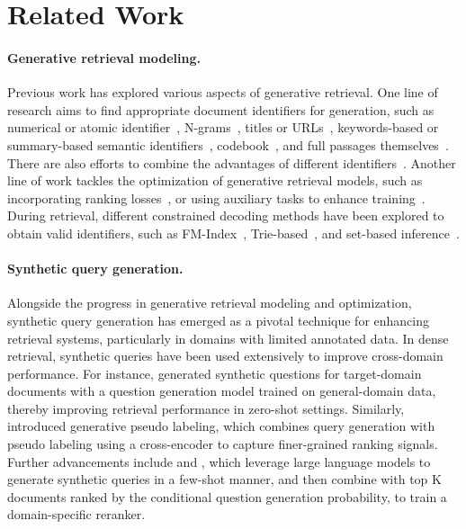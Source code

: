 \section{Related Work}
\paragraph{Generative retrieval modeling.}
Previous work has explored various aspects of generative retrieval. One line of research aims to find appropriate document identifiers for generation, such as numerical or atomic identifier~\citep{DBLP:conf/nips/Tay00NBM000GSCM22,DBLP:journals/corr/abs-2206-10128,DBLP:journals/corr/abs-2208-09257}, N-grams~\citep{DBLP:conf/nips/BevilacquaOLY0P22,DBLP:conf/sigir/Chen0GR0FC23}, titles or URLs~\citep{DBLP:journals/ipm/LiYWWL23,lee-etal-2022-generative,DBLP:conf/cikm/ChenZG0FC22,ziems-etal-2023-large}, keywords-based or summary-based semantic identifiers~\citep{lee-etal-2023-glen,DBLP:conf/kdd/Tang0GCZWYC23}, codebook~\citep{DBLP:conf/nips/ZhangWCCZMHDMWP23,yang-etal-2023-auto,DBLP:conf/www/Zeng0JSWZ24}, and full passages themselves~\citep{tang2024selfretrievalendtoendinformationretrieval}. There are also efforts to combine the advantages of different identifiers~\citep{li-etal-2023-multiview}. Another line of work tackles the optimization of generative retrieval models, such as incorporating ranking losses~\citep{zhou-etal-2023-enhancing-generative,DBLP:conf/aaai/00010WWL24,DBLP:journals/tois/TangZGRCC24}, or using auxiliary tasks to enhance training~\citep{DBLP:conf/sigir/LiD0L24}. During retrieval, different constrained decoding methods have been explored to obtain valid identifiers, such as FM-Index~\citep{DBLP:conf/nips/BevilacquaOLY0P22}, Trie-based~\citep{DBLP:journals/corr/abs-2010-00904}, and set-based inference~\citep{DBLP:journals/tois/TangZGRCC24}.

\paragraph{Synthetic query generation.}
Alongside the progress in generative retrieval modeling and optimization, synthetic query generation has emerged as a pivotal technique for enhancing retrieval systems, particularly in domains with limited annotated data.
In dense retrieval, synthetic queries have been used extensively to improve cross-domain performance.
For instance, \citet{ma2021zero} generated synthetic questions for target-domain documents with a question generation model trained on general-domain data, thereby improving retrieval performance in zero-shot settings.
Similarly, \citet{wang2022gpl} introduced generative pseudo labeling, which combines query generation with pseudo labeling using a cross-encoder to capture finer-grained ranking signals.
Further advancements include \citet{bonifacio2022inpars} and \citet{jeronymo2023inpars}, which leverage large language models to generate synthetic queries in a few-shot manner, and then combine with top K documents ranked by the conditional question generation probability, to train a domain-specific reranker.

